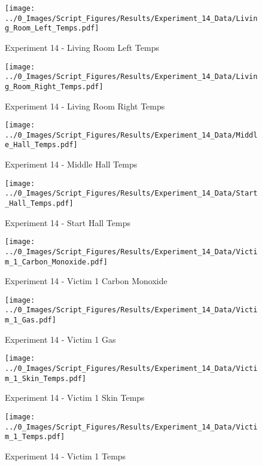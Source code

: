 	\begin{figure}[H]
		\centering
		\texttt{[image: ../0\_Images/Script\_Figures/Results/Experiment\_14\_Data/Living\_Room\_Left\_Temps.pdf]}
		\caption[]{Experiment 14 - Living Room Left Temps}
	\end{figure}
 
	\clearpage

	\begin{figure}[H]
		\centering
		\texttt{[image: ../0\_Images/Script\_Figures/Results/Experiment\_14\_Data/Living\_Room\_Right\_Temps.pdf]}
		\caption[]{Experiment 14 - Living Room Right Temps}
	\end{figure}
 

	\begin{figure}[H]
		\centering
		\texttt{[image: ../0\_Images/Script\_Figures/Results/Experiment\_14\_Data/Middle\_Hall\_Temps.pdf]}
		\caption[]{Experiment 14 - Middle Hall Temps}
	\end{figure}
 
	\clearpage

	\begin{figure}[H]
		\centering
		\texttt{[image: ../0\_Images/Script\_Figures/Results/Experiment\_14\_Data/Start\_Hall\_Temps.pdf]}
		\caption[]{Experiment 14 - Start Hall Temps}
	\end{figure}
 

	\begin{figure}[H]
		\centering
		\texttt{[image: ../0\_Images/Script\_Figures/Results/Experiment\_14\_Data/Victim\_1\_Carbon\_Monoxide.pdf]}
		\caption[]{Experiment 14 - Victim 1 Carbon Monoxide}
	\end{figure}
 
	\clearpage

	\begin{figure}[H]
		\centering
		\texttt{[image: ../0\_Images/Script\_Figures/Results/Experiment\_14\_Data/Victim\_1\_Gas.pdf]}
		\caption[]{Experiment 14 - Victim 1 Gas}
	\end{figure}
 

	\begin{figure}[H]
		\centering
		\texttt{[image: ../0\_Images/Script\_Figures/Results/Experiment\_14\_Data/Victim\_1\_Skin\_Temps.pdf]}
		\caption[]{Experiment 14 - Victim 1 Skin Temps}
	\end{figure}
 
	\clearpage

	\begin{figure}[H]
		\centering
		\texttt{[image: ../0\_Images/Script\_Figures/Results/Experiment\_14\_Data/Victim\_1\_Temps.pdf]}
		\caption[]{Experiment 14 - Victim 1 Temps}
	\end{figure}
 

